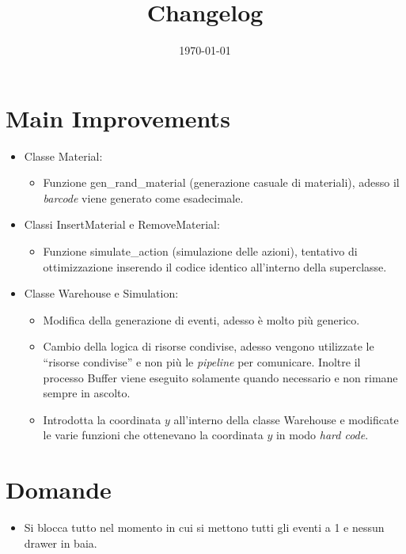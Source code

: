 \documentclass[a4paper]{article}
\newcommand{\dquotes}[1]{``#1''}
\begin{document}
	\title{Changelog}
	\date{\today}
	\maketitle
	
	\newpage
	
	\section*{Main Improvements}
	\begin{itemize}[label=]
		\item Classe \textsf{Material}:
		\begin{itemize}
			\item Funzione \textsf{gen\_rand\_material} (generazione casuale di materiali), adesso il \emph{barcode} viene generato come esadecimale.
		\end{itemize}
	
		\item Classi \textsf{InsertMaterial} e \textsf{RemoveMaterial}:
		\begin{itemize}
			\item Funzione \textsf{simulate\_action} (simulazione delle azioni), tentativo di ottimizzazione inserendo il codice identico all'interno della superclasse.
		\end{itemize}
	
		\item Classe \textsf{Warehouse} e \textsf{Simulation}:
		\begin{itemize}
			\item Modifica della generazione di eventi, adesso è molto più generico.
			\item Cambio della logica di risorse condivise, adesso vengono utilizzate le \dquotes{risorse condivise} e non più le \emph{pipeline} per comunicare. Inoltre il processo \textsf{Buffer} viene eseguito solamente quando necessario e non rimane sempre in ascolto.
			\item Introdotta la coordinata $y$ all'interno della classe \textsf{Warehouse} e modificate le varie funzioni che ottenevano la coordinata $y$ in modo \emph{hard code}.
		\end{itemize}
	\end{itemize}
	
	\section*{Domande}
	\begin{itemize}
		\item Si blocca tutto nel momento in cui si mettono tutti gli eventi a 1 e nessun drawer in baia.
	\end{itemize}
\end{document}
